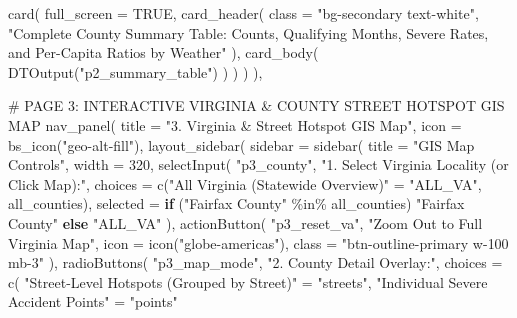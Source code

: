 \documentclass[
  letterpaper,
  DIV=11,
  numbers=noendperiod]{scrartcl}
\newenvironment{Shaded}{\begin{snugshade}}{\end{snugshade}}
\newcommand{\AttributeTok}[1]{\textcolor[rgb]{0.40,0.45,0.13}{#1}}
\newcommand{\CommentTok}[1]{\textcolor[rgb]{0.37,0.37,0.37}{#1}}
\newcommand{\ConstantTok}[1]{\textcolor[rgb]{0.56,0.35,0.01}{#1}}
\newcommand{\ControlFlowTok}[1]{\textcolor[rgb]{0.00,0.23,0.31}{\textbf{#1}}}
\newcommand{\DecValTok}[1]{\textcolor[rgb]{0.68,0.00,0.00}{#1}}
\newcommand{\FunctionTok}[1]{\textcolor[rgb]{0.28,0.35,0.67}{#1}}
\newcommand{\NormalTok}[1]{\textcolor[rgb]{0.00,0.23,0.31}{#1}}
\newcommand{\OtherTok}[1]{\textcolor[rgb]{0.00,0.23,0.31}{#1}}
\newcommand{\SpecialCharTok}[1]{\textcolor[rgb]{0.37,0.37,0.37}{#1}}
\newcommand{\StringTok}[1]{\textcolor[rgb]{0.13,0.47,0.30}{#1}}
\begin{document}
\begin{Shaded}
\begin{Highlighting}[]
      \FunctionTok{card}\NormalTok{(}
        \AttributeTok{full\_screen =} \ConstantTok{TRUE}\NormalTok{,}
        \FunctionTok{card\_header}\NormalTok{(}
          \AttributeTok{class =} \StringTok{"bg{-}secondary text{-}white"}\NormalTok{,}
          \StringTok{"Complete County Summary Table: Counts, Qualifying Months, Severe Rates, and Per{-}Capita Ratios by Weather"}
\NormalTok{        ),}
        \FunctionTok{card\_body}\NormalTok{(}
          \FunctionTok{DTOutput}\NormalTok{(}\StringTok{"p2\_summary\_table"}\NormalTok{)}
\NormalTok{        )}
\NormalTok{      )}
\NormalTok{    )}
\NormalTok{  ),}

  \CommentTok{\# PAGE 3: INTERACTIVE VIRGINIA \& COUNTY STREET HOTSPOT GIS MAP}
  \FunctionTok{nav\_panel}\NormalTok{(}
    \AttributeTok{title =} \StringTok{"3. Virginia \& Street Hotspot GIS Map"}\NormalTok{,}
    \AttributeTok{icon =} \FunctionTok{bs\_icon}\NormalTok{(}\StringTok{"geo{-}alt{-}fill"}\NormalTok{),}
    \FunctionTok{layout\_sidebar}\NormalTok{(}
      \AttributeTok{sidebar =} \FunctionTok{sidebar}\NormalTok{(}
        \AttributeTok{title =} \StringTok{"GIS Map Controls"}\NormalTok{,}
        \AttributeTok{width =} \DecValTok{320}\NormalTok{,}
        \FunctionTok{selectInput}\NormalTok{(}
          \StringTok{"p3\_county"}\NormalTok{,}
          \StringTok{"1. Select Virginia Locality (or Click Map):"}\NormalTok{,}
          \AttributeTok{choices =} \FunctionTok{c}\NormalTok{(}\StringTok{"All Virginia (Statewide Overview)"} \OtherTok{=} \StringTok{"ALL\_VA"}\NormalTok{, all\_counties),}
          \AttributeTok{selected =} \ControlFlowTok{if}\NormalTok{ (}\StringTok{"Fairfax County"} \SpecialCharTok{\%in\%}\NormalTok{ all\_counties) }\StringTok{"Fairfax County"} \ControlFlowTok{else} \StringTok{"ALL\_VA"}
\NormalTok{        ),}
        \FunctionTok{actionButton}\NormalTok{(}
          \StringTok{"p3\_reset\_va"}\NormalTok{,}
          \StringTok{"Zoom Out to Full Virginia Map"}\NormalTok{,}
          \AttributeTok{icon =} \FunctionTok{icon}\NormalTok{(}\StringTok{"globe{-}americas"}\NormalTok{),}
          \AttributeTok{class =} \StringTok{"btn{-}outline{-}primary w{-}100 mb{-}3"}
\NormalTok{        ),}
        \FunctionTok{radioButtons}\NormalTok{(}
          \StringTok{"p3\_map\_mode"}\NormalTok{,}
          \StringTok{"2. County Detail Overlay:"}\NormalTok{,}
          \AttributeTok{choices =} \FunctionTok{c}\NormalTok{(}
            \StringTok{"Street{-}Level Hotspots (Grouped by Street)"} \OtherTok{=} \StringTok{"streets"}\NormalTok{,}
            \StringTok{"Individual Severe Accident Points"}         \OtherTok{=} \StringTok{"points"}

\end{Highlighting}
\end{Shaded}
\end{document}

